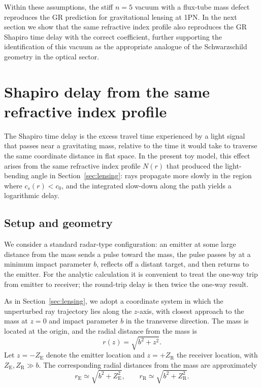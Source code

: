 \documentclass[11pt]{article}
\begin{document}
Within these assumptions, the stiff $n=5$ vacuum with a flux-tube mass
defect reproduces the GR prediction for gravitational lensing at 1PN.
In the next section we show that the same refractive index profile also
reproduces the GR Shapiro time delay with the correct coefficient, further
supporting the identification of this vacuum as the appropriate analogue of
the Schwarzschild geometry in the optical sector.

\section{Shapiro delay from the same refractive index profile}
\label{sec:shapiro}

The Shapiro time delay is the excess travel time experienced by a light
signal that passes near a gravitating mass, relative to the time it would
take to traverse the same coordinate distance in flat space.
In the present toy model, this effect arises from the same refractive index
profile $N(r)$ that produced the light-bending angle in
Section~\ref{sec:lensing}: rays propagate more slowly in the region where
$c_s(r) < c_0$, and the integrated slow-down along the path yields a
logarithmic delay.


\subsection{Setup and geometry}
\label{subsec:shapiro-setup}

We consider a standard radar-type configuration: an emitter at some large
distance from the mass sends a pulse toward the mass, the pulse passes by
at a minimum impact parameter $b$, reflects off a distant target, and then
returns to the emitter.
For the analytic calculation it is convenient to treat the one-way trip
from emitter to receiver; the round-trip delay is then twice the one-way
result.

As in Section~\ref{sec:lensing}, we adopt a coordinate system in which the
unperturbed ray trajectory lies along the $z$-axis, with closest approach
to the mass at $z=0$ and impact parameter $b$ in the transverse direction.
The mass is located at the origin, and the radial distance from the mass is
\begin{equation}
  r(z) = \sqrt{b^2 + z^2}.
\end{equation}
Let $z = -Z_\mathrm{E}$ denote the emitter location and $z = +Z_\mathrm{R}$
the receiver location, with $Z_\mathrm{E}, Z_\mathrm{R} \gg b$.
The corresponding radial distances from the mass are approximately
\begin{equation}
  r_\mathrm{E} \simeq \sqrt{b^2 + Z_\mathrm{E}^2},
  \qquad
  r_\mathrm{R} \simeq \sqrt{b^2 + Z_\mathrm{R}^2}.
\end{equation}
\end{document}
